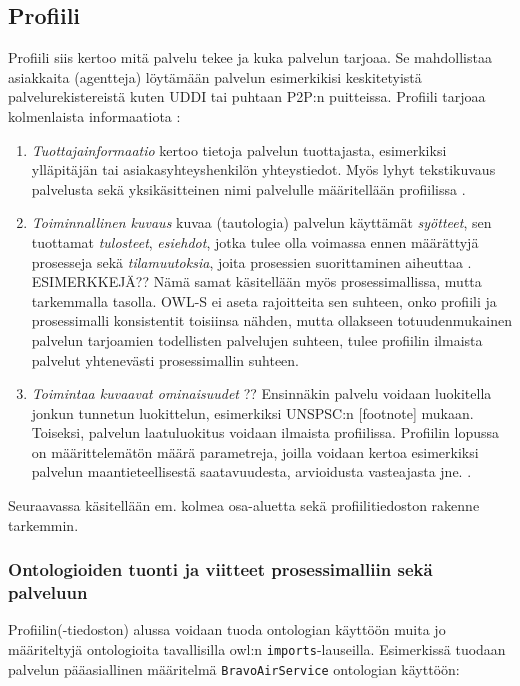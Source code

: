 \documentclass[finnish]{tktltiki2}
\theoremstyle{definition}
\theoremstyle{remark}
\begin{document}
\subsection{Profiili}

Profiili siis kertoo mitä palvelu tekee ja kuka palvelun tarjoaa. Se mahdollistaa asiakkaita (agentteja) löytämään palvelun esimerkikisi keskitetyistä palvelurekistereistä kuten UDDI tai puhtaan P2P:n puitteissa. 
Profiili tarjoaa kolmenlaista informaatiota \cite{OWLS}:

\begin{enumerate}
 \item \textit{Tuottajainformaatio} kertoo tietoja palvelun tuottajasta, esimerkiksi ylläpitäjän tai asiakasyhteyshenkilön yhteystiedot. Myös lyhyt tekstikuvaus palvelusta sekä yksikäsitteinen nimi palvelulle määritellään profiilissa\cite{OWLS} .
 
 \item \textit{Toiminnallinen kuvaus} kuvaa (tautologia) palvelun käyttämät \textit{syötteet}, sen tuottamat \textit{tulosteet}, \textit{esiehdot}, jotka tulee olla voimassa ennen määrättyjä
 prosesseja sekä \textit{tilamuutoksia}, joita prosessien suorittaminen aiheuttaa \cite{OWLS}. ESIMERKKEJÄ?? Nämä samat käsitellään myös prosessimallissa, mutta tarkemmalla tasolla. OWL-S ei aseta
 rajoitteita sen suhteen, onko profiili ja prosessimalli konsistentit toisiinsa nähden, mutta ollakseen totuudenmukainen palvelun tarjoamien todellisten palvelujen suhteen, tulee profiilin ilmaista
 palvelut yhtenevästi prosessimallin suhteen. 
 
 \item \textit{Toimintaa kuvaavat ominaisuudet} ?? Ensinnäkin palvelu voidaan luokitella jonkun tunnetun luokittelun, esimerkiksi UNSPSC:n [footnote] mukaan. Toiseksi, palvelun laatuluokitus voidaan 
 ilmaista profiilissa. Profiilin lopussa on määrittelemätön määrä parametreja, joilla voidaan kertoa esimerkiksi palvelun maantieteellisestä saatavuudesta, arvioidusta vasteajasta jne. \cite{OWLS}.
\end{enumerate}

Seuraavassa käsitellään em. kolmea osa-aluetta sekä profiilitiedoston rakenne tarkemmin. 

\subsubsection{Ontologioiden tuonti ja viitteet prosessimalliin sekä palveluun}

Profiilin(-tiedoston) alussa voidaan tuoda ontologian käyttöön muita jo määriteltyjä ontologioita tavallisilla owl:n \texttt{imports}-lauseilla. Esimerkissä tuodaan palvelun pääasiallinen määritelmä \texttt{BravoAirService} ontologian käyttöön\cite{daml}:  
\end{document}
